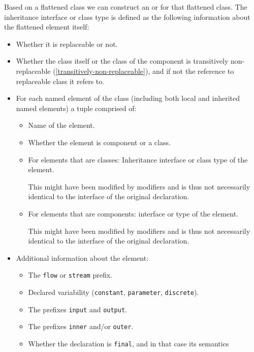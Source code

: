Based on a flattened class we can construct an  or  for that flattened class.
The inheritance interface or class type is defined as the following information about the flattened element itself:
\begin{itemize}
\item
  Whether it is replaceable or not.
\item
  Whether the class itself or the class of the component is transitively
  non-replaceable (\cref{transitively-non-replaceable}), and if not the reference to
  replaceable class it refers to.
\item
  For each named element of the class (including both local and
  inherited named elements) a tuple comprised of:
  \begin{itemize}
  \item
    Name of the element.
  \item
    Whether the element is component or a class.
  \item
    For elements that are classes: Inheritance interface or class type of the element.
    \begin{nonnormative}
    This might have been modified by modifiers and is thus not necessarily identical to the interface of the original declaration.
    \end{nonnormative}
  \item
    For elements that are components: interface or type of the element.
    \begin{nonnormative}
    This might have been modified by modifiers and is thus not necessarily identical to the interface of the original declaration.
    \end{nonnormative}
  \end{itemize}
\item
  Additional information about the element:
  \begin{itemize}
  \item
    The \lstinline!flow! or \lstinline!stream! prefix.
  \item
    Declared variability (\lstinline!constant!, \lstinline!parameter!, \lstinline!discrete!).
  \item
    The prefixes \lstinline!input! and \lstinline!output!.
  \item
    The prefixes \lstinline!inner! and/or \lstinline!outer!.
  \item
    Whether the declaration is \lstinline!final!, and in that case its semantics

\end{itemize}
\end{itemize}
